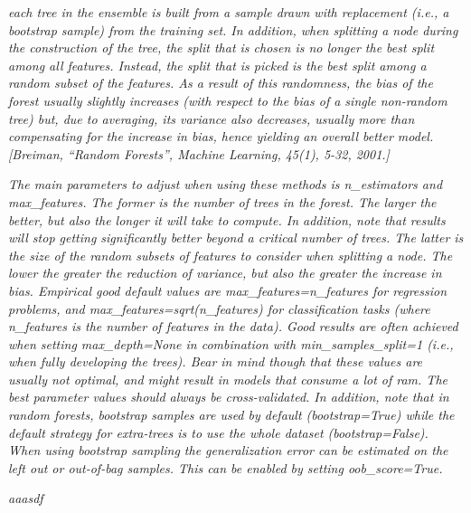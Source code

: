 \textit{each tree in the ensemble is built from a sample drawn with replacement (i.e., a bootstrap sample) from the training set. In addition, when splitting a node during the construction of the tree, the split that is chosen is no longer the best split among all features. Instead, the split that is picked is the best split among a random subset of the features. As a result of this randomness, the bias of the forest usually slightly increases (with respect to the bias of a single non-random tree) but, due to averaging, its variance also decreases, usually more than compensating for the increase in bias, hence yielding an overall better model. [Breiman, “Random Forests”, Machine Learning, 45(1), 5-32, 2001.] }

\textit{The main parameters to adjust when using these methods is n_estimators and max_features. The former is the number of trees in the forest. The larger the better, but also the longer it will take to compute. In addition, note that results will stop getting significantly better beyond a critical number of trees. The latter is the size of the random subsets of features to consider when splitting a node. The lower the greater the reduction of variance, but also the greater the increase in bias. Empirical good default values are max_features=n_features for regression problems, and max_features=sqrt(n_features) for classification tasks (where n_features is the number of features in the data). Good results are often achieved when setting max_depth=None in combination with min_samples_split=1 (i.e., when fully developing the trees). Bear in mind though that these values are usually not optimal, and might result in models that consume a lot of ram. The best parameter values should always be cross-validated. In addition, note that in random forests, bootstrap samples are used by default (bootstrap=True) while the default strategy for extra-trees is to use the whole dataset (bootstrap=False). When using bootstrap
sampling the generalization error can be estimated on the left out or out-of-bag samples. This can be enabled by setting oob_score=True.}



\textit{aaasdf}





